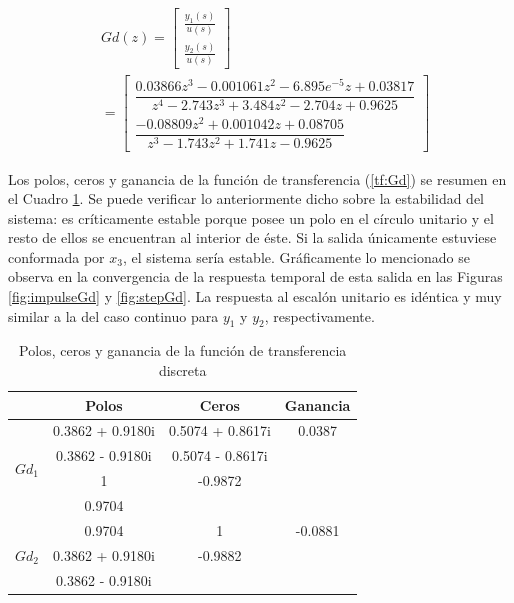 \documentclass[journal]{IEEEtran}
\begin{document}
\begin{equation}
\label{tf:Gd}
\begin{aligned}
&Gd(z) = \begin{bmatrix}
	\frac{y_1(s)}{u(s)}\\
	\frac{y_2(s)}{u(s)}
\end{bmatrix} \\
& = 
\begin{bmatrix}
\dfrac{0.03866 z^3 - 0.001061 z^2 - 6.895e^{-5} z + 0.03817}{z^4 - 2.743 z^3 + 3.484 z^2 - 2.704 z + 0.9625}\\
\dfrac{-0.08809 z^2 + 0.001042 z + 0.08705}{z^3 - 1.743 z^2 + 1.741 z - 0.9625}
\end{bmatrix}
\end{aligned}
\end{equation}
\textbf{}

Los polos, ceros y ganancia de la función de transferencia (\ref{tf:Gd}) se resumen en el Cuadro \ref{tab: pzg tfd}. Se puede verificar lo anteriormente dicho sobre la estabilidad del sistema: es críticamente estable porque posee un polo en el círculo unitario y el resto de ellos se encuentran al interior de éste. Si la salida únicamente estuviese conformada por $x_3$, el sistema sería estable. Gráficamente lo mencionado se observa en la convergencia de la respuesta temporal de esta salida en las Figuras \ref{fig:impulseGd} y \ref{fig:stepGd}. La respuesta al escalón unitario es idéntica y muy similar a la del caso continuo para $y_1$ y $y_2$, respectivamente.\\

\begin{table}[!h]
\centering
\caption{Polos, ceros y ganancia de la función de transferencia discreta}
\label{tab: pzg tfd}
\begin{tabular}{@{}lccc@{}}
\toprule
                  & Polos & Ceros             & Ganancia          \\ \midrule
\multirow{4}{*}{$Gd_1$} & 0.3862 + 0.9180i & 0.5074 + 0.8617i & 0.0387 \\
                  & 0.3862 - 0.9180i & 0.5074 - 0.8617i &                   \\
                  & 1 & -0.9872 &                   \\
                  & 0.9704 & &                   \\    
                 \midrule
\multirow{4}{*}{$Gd_2$} & 0.9704 & 1 & -0.0881 \\
                  & 0.3862 + 0.9180i & -0.9882 &                   \\  
                  &  0.3862 - 0.9180i &  &
                  \\ \bottomrule
\end{tabular}
\end{table}
\end{document}

